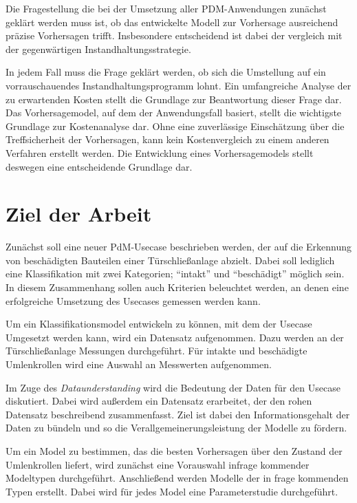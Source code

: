 Die Fragestellung die bei der Umsetzung aller PDM-Anwendungen zunächst geklärt werden muss ist, ob das entwickelte Modell zur Vorhersage ausreichend präzise Vorhersagen trifft. Insbesondere entscheidend ist dabei der vergleich mit der gegenwärtigen Instandhaltungsstrategie.

In jedem Fall muss die Frage geklärt werden, ob sich die Umstellung auf ein vorrauschauendes Instandhaltungsprogramm lohnt. Ein umfangreiche Analyse der zu erwartenden Kosten stellt die Grundlage zur Beantwortung dieser Frage dar. Das Vorhersagemodel, auf dem der Anwendungsfall basiert, stellt die wichtigste Grundlage zur Kostenanalyse dar. Ohne eine zuverlässige Einschätzung über die Treffsicherheit der Vorhersagen, kann kein Kostenvergleich zu einem anderen Verfahren erstellt werden. Die Entwicklung eines Vorhersagemodels stellt deswegen eine entscheidende Grundlage dar. 


\section{Ziel der Arbeit}
\label{sec:ziel}
Zunächst soll eine neuer PdM-Usecase beschrieben werden, der auf die Erkennung von beschädigten Bauteilen einer Türschließanlage abzielt. Dabei soll lediglich eine Klassifikation mit zwei Kategorien; \enquote{intakt} und \enquote{beschädigt} möglich sein. In diesem Zusammenhang sollen auch Kriterien beleuchtet werden, an denen eine erfolgreiche Umsetzung des Usecases gemessen werden kann.

Um ein Klassifikationsmodel entwickeln zu können, mit dem der Usecase Umgesetzt werden kann, wird ein Datensatz aufgenommen. Dazu werden an der Türschließanlage Messungen durchgeführt. Für intakte und beschädigte Umlenkrollen wird eine Auswahl an Messwerten aufgenommen. 

Im Zuge des \textit{Dataunderstanding} wird die Bedeutung der Daten für den Usecase diskutiert. Dabei wird außerdem ein Datensatz erarbeitet, der den rohen Datensatz beschreibend zusammenfasst. Ziel ist dabei den Informationsgehalt der Daten zu bündeln und so die Verallgemeinerungsleistung der Modelle zu fördern.

Um ein Model zu bestimmen, das die besten Vorhersagen über den Zustand der Umlenkrollen liefert, wird zunächst eine Vorauswahl infrage kommender Modeltypen durchgeführt. Anschließend werden Modelle der in frage kommenden Typen erstellt. Dabei wird für jedes Model eine Parameterstudie durchgeführt.

